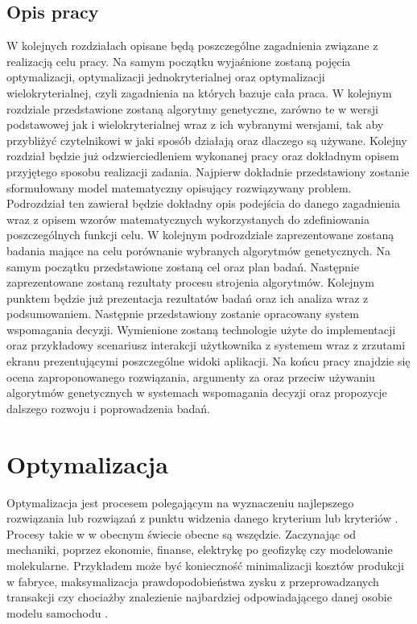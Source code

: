 \documentclass[twoside]{iisthesis}
\begin{document}
\section{Opis pracy}
W kolejnych rozdziałach opisane będą poszczególne zagadnienia związane z realizacją celu pracy. Na samym początku wyjaśnione zostaną pojęcia optymalizacji, optymalizacji jednokryterialnej oraz optymalizacji wielokryterialnej, czyli zagadnienia na których bazuje cała praca. W kolejnym rozdziale przedstawione zostaną algorytmy genetyczne, zarówno te w wersji podstawowej jak i wielokryterialnej wraz z ich wybranymi wersjami, tak aby przybliżyć czytelnikowi w jaki sposób działają oraz dlaczego są używane. Kolejny rozdział będzie już odzwierciedleniem wykonanej pracy oraz dokładnym opisem przyjętego sposobu realizacji zadania. Najpierw dokładnie przedstawiony zostanie sformułowany model matematyczny opisujący rozwiązywany problem. Podrozdział ten zawierał będzie dokładny opis podejścia do danego zagadnienia wraz z opisem wzorów matematycznych wykorzystanych do zdefiniowania poszczególnych funkcji celu. W kolejnym podrozdziale zaprezentowane zostaną badania mające na celu porównanie wybranych algorytmów genetycznych. Na samym początku przedstawione zostaną cel oraz plan badań. Następnie zaprezentowane zostaną rezultaty procesu strojenia algorytmów. Kolejnym punktem będzie już prezentacja rezultatów badań oraz ich analiza wraz z podsumowaniem. Następnie przedstawiony zostanie opracowany system wspomagania decyzji. Wymienione zostaną technologie użyte do implementacji oraz przykładowy scenariusz interakcji użytkownika z systemem wraz z zrzutami ekranu prezentującymi poszczególne widoki aplikacji. Na końcu pracy znajdzie się ocena zaproponowanego rozwiązania, argumenty za oraz przeciw używaniu algorytmów genetycznych w systemach wspomagania decyzji oraz propozycje dalszego rozwoju i poprowadzenia badań.

\chapter{Optymalizacja}
Optymalizacja jest procesem polegającym na wyznaczeniu najlepszego rozwiązania lub rozwiązań z punktu widzenia danego kryterium lub kryteriów \cite{wiki_optimization}. Procesy takie w w obecnym świecie obecne są wszędzie. Zaczynając od mechaniki, poprzez ekonomie, finanse, elektrykę po geofizykę czy modelowanie molekularne. Przykładem może być konieczność minimalizacji kosztów produkcji w fabryce, maksymalizacja prawdopodobieństwa zysku z przeprowadzanych transakcji czy chociażby znalezienie najbardziej odpowiadającego danej osobie modelu samochodu \cite{wiki_pl_optimization}.
\end{document}
